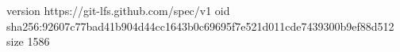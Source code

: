 version https://git-lfs.github.com/spec/v1
oid sha256:92607c77bad41b904d44cc1643b0c69695f7e521d011cde7439300b9ef88d512
size 1586
